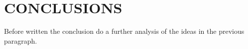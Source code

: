 \documentclass[letterpaper, 10 pt, conference]{ieeeconf}  %
\begin{document}
%

%

\section{CONCLUSIONS}
Before written the conclusion do a further analysis of the ideas in the previous paragraph.
\end{document}
